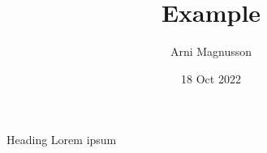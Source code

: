 \documentclass[aspectratio=169]{beamer}
\begin{document}
\begin{frame}
  \title{Example}
  \author{Arni Magnusson}
  \date{18 Oct 2022}
  \titlepage
\end{frame}

\begin{frame}{Heading}
  Lorem ipsum
\end{frame}
\end{document}
